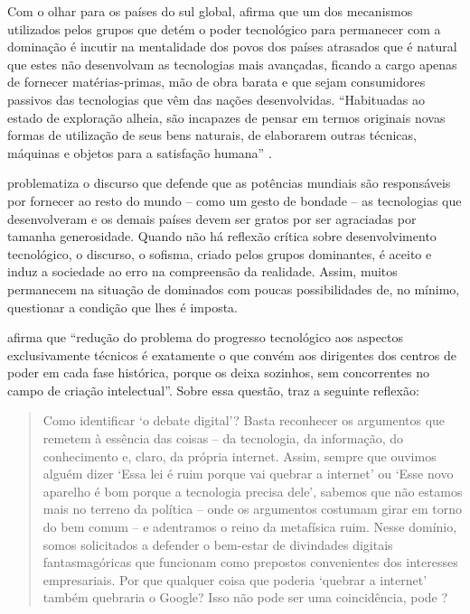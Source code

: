\documentclass[portuguese]{textolivre}
\begin{document}
Com o olhar para os países do sul global, \textcite{pinto_o_2005} afirma que um dos mecanismos utilizados pelos grupos que detém o poder tecnológico para permanecer com a dominação é incutir na mentalidade dos povos dos países atrasados que é natural que estes não desenvolvam as tecnologias mais avançadas, ficando a cargo apenas de fornecer matérias-primas, mão de obra barata e que sejam consumidores passivos das tecnologias que vêm das nações desenvolvidas. “Habituadas ao estado de exploração alheia, são incapazes de pensar em termos originais novas formas de utilização de seus bens naturais, de elaborarem outras técnicas, máquinas e objetos para a satisfação humana” \cite[p.46]{pinto_o_2005}.

\textcite{pinto_o_2005} problematiza o discurso que defende que as potências mundiais são responsáveis por fornecer ao resto do mundo – como um gesto de bondade – as tecnologias que desenvolveram e os demais países devem ser gratos por ser agraciadas por tamanha generosidade. Quando não há reflexão crítica sobre desenvolvimento tecnológico, o discurso, o sofisma, criado pelos grupos dominantes, é aceito e induz a sociedade ao erro na compreensão da realidade. Assim, muitos permanecem na situação de dominados com poucas possibilidades de, no mínimo, questionar a condição que lhes é imposta.

\textcite[p. 46]{pinto_o_2005} afirma que “redução do problema do progresso tecnológico aos aspectos exclusivamente técnicos é exatamente o que convém aos dirigentes dos centros de poder em cada fase histórica, porque os deixa sozinhos, sem concorrentes no campo de criação intelectual”. Sobre essa questão, \textcite{morozov2018} traz a seguinte reflexão:

\begin{quote}
 Como identificar ‘o debate digital’? Basta reconhecer os argumentos que remetem à essência das coisas – da tecnologia, da informação, do conhecimento e, claro, da própria internet. Assim, sempre que ouvimos alguém dizer ‘Essa lei é ruim porque vai quebrar a internet’ ou ‘Esse novo aparelho é bom porque a tecnologia precisa dele’, sabemos que não estamos mais no terreno da política – onde os argumentos costumam girar em torno do bem comum – e adentramos o reino da metafísica ruim. Nesse domínio, somos solicitados a defender o bem-estar de divindades digitais fantasmagóricas que funcionam como prepostos convenientes dos interesses empresariais. Por que qualquer coisa que poderia ‘quebrar a internet’ também quebraria o Google? Isso não pode ser uma coincidência, pode \cite[p. 30]{morozov2018}?
\end{quote}
\end{document}
